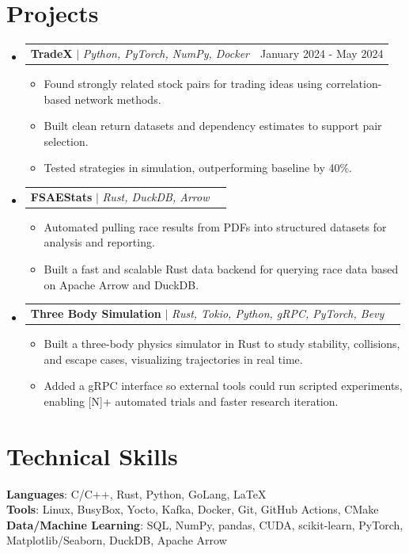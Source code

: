 \documentclass[letterpaper,11pt]{article}
\makeatletter
\newcommand{\resumeItem}[1]{
  \item\small{
    {#1 \vspace{-2pt}}
  }
}
\newcommand{\resumeProjectHeading}[2]{
    \item
    \begin{tabular*}{0.97\textwidth}{l@{\extracolsep{\fill}}r}
      \small#1 & #2 \\
    \end{tabular*}\vspace{-7pt}
}
\newcommand{\resumeSubHeadingListStart}{\begin{itemize}[leftmargin=0.15in, label={}]}
\newcommand{\resumeSubHeadingListEnd}{\end{itemize}}
\newcommand{\resumeItemListStart}{\begin{itemize}}
\newcommand{\resumeItemListEnd}{\end{itemize}\vspace{-5pt}}
\makeatother
\begin{document}
\section{Projects}
    \resumeSubHeadingListStart
      \resumeProjectHeading
      {\textbf{TradeX} $|$ \emph{Python, PyTorch, NumPy, Docker}}{January 2024 - May 2024}
          \resumeItemListStart
          \resumeItem{Found strongly related stock pairs for trading ideas using correlation-based network methods.}
          \resumeItem{Built clean return datasets and dependency estimates to support pair selection.}
          \resumeItem{Tested strategies in simulation, outperforming baseline by 40\%.}
          \resumeItemListEnd
      \resumeProjectHeading
          {\textbf{FSAEStats} $|$ \emph{Rust, DuckDB, Arrow}}{}
          \resumeItemListStart
          \resumeItem{Automated pulling race results from PDFs into structured datasets for analysis and reporting.}
          \resumeItem{Built a fast and scalable Rust data backend for querying race data based on Apache Arrow and DuckDB.}
          \resumeItemListEnd
                \resumeProjectHeading
          {\textbf{Three Body Simulation} $|$ \emph{Rust, Tokio, Python, gRPC, PyTorch, Bevy}}{}
          \resumeItemListStart
          \resumeItem{Built a three-body physics simulator in Rust to study stability, collisions, and escape cases, visualizing trajectories in real time.}
          \resumeItem{Added a gRPC interface so external tools could run scripted experiments, enabling [N]+ automated trials and faster research iteration.}

          \resumeItemListEnd

    \resumeSubHeadingListEnd
%
\section{Technical Skills}
 \begin{itemize}[leftmargin=0.15in, label={}]
    \small{\item{
     \textbf{Languages}{: C/C++, Rust, Python, GoLang, \LaTeX} \\
     \textbf{Tools}{: Linux, BusyBox, Yocto, Kafka, Docker, Git, GitHub Actions, CMake} \\
     \textbf{Data/Machine Learning}{: SQL, NumPy, pandas, CUDA, scikit-learn, PyTorch, Matplotlib/Seaborn, DuckDB, Apache Arrow}
    }}
 \end{itemize}

\end{document}
